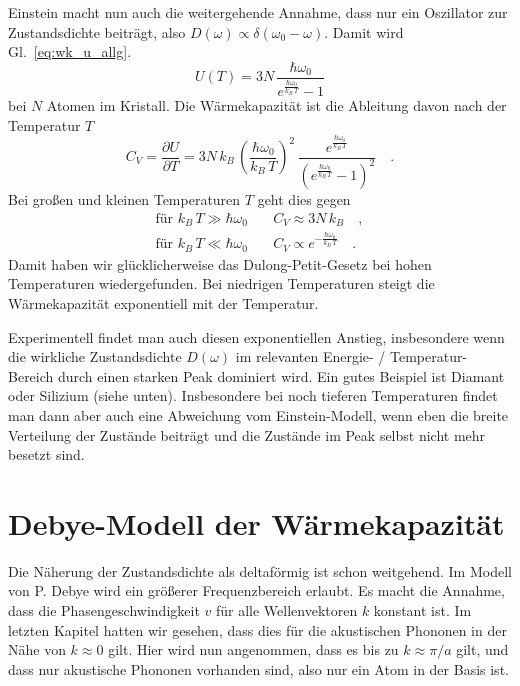 Einstein macht nun auch die weitergehende Annahme, dass nur ein Oszillator zur  Zustandsdichte beiträgt, also $D(\omega) \propto \delta(\omega_0 - \omega)$. Damit wird Gl.~\ref{eq:wk_u_allg}.
\begin{equation}
U(T) =  3N \, \frac{\hbar \omega_0 }{e^{\frac{\hbar \omega_0}{k_B \, T} }- 1}
\end{equation}
bei $N$ Atomen im Kristall. Die Wärmekapazität ist die Ableitung davon nach der Temperatur $T$
\begin{equation}
C_V = \frac{\partial U}{\partial T }  =3 N \, k_B \, 
\left( \frac{\hbar \omega_0}{k_B \, T} \right)^2 
\, \frac{e^{\frac{\hbar \omega_0}{k_B \, T} }}
{\left( e^{\frac{\hbar \omega_0}{k_B \, T} }- 1 \right)^2} \quad .
\end{equation}
Bei großen und kleinen Temperaturen $T$ geht dies gegen
\begin{align}
\text{für } k_B \, T \gg \hbar \omega_0  \quad & C_V \approx 3 N \, k_B \quad , \\
\text{für } k_B \, T \ll \hbar \omega_0  \quad & C_V \propto e^{-\frac{\hbar \omega_0}{k_B \, T} } \quad .
\end{align}
Damit haben wir glücklicherweise das Dulong-Petit-Gesetz bei hohen Temperaturen wiedergefunden. Bei niedrigen Temperaturen steigt die Wärmekapazität exponentiell mit der Temperatur.

Experimentell findet man auch diesen exponentiellen Anstieg, insbesondere wenn die wirkliche Zustandsdichte $D(\omega)$ im relevanten Energie- / Temperatur-Bereich durch einen starken Peak dominiert wird. Ein gutes Beispiel ist Diamant oder Silizium (siehe unten). Insbesondere bei noch tieferen Temperaturen findet man dann aber auch eine Abweichung vom Einstein-Modell, wenn eben die breite Verteilung der Zustände beiträgt und die Zustände im Peak selbst nicht mehr besetzt sind.



\section{Debye-Modell der Wärmekapazität}

Die Näherung der Zustandsdichte als deltaförmig ist schon weitgehend. Im Modell von P. Debye wird ein größerer Frequenzbereich erlaubt. Es macht die Annahme, dass die Phasengeschwindigkeit $v$ für alle Wellenvektoren $k$ konstant ist. Im letzten Kapitel hatten wir gesehen, dass dies für die akustischen Phononen in der Nähe von $k \approx 0$ gilt. Hier wird nun angenommen, dass es bis zu $k \approx \pi / a$ gilt, und dass nur akustische Phononen vorhanden sind, also nur ein Atom in der Basis ist.

